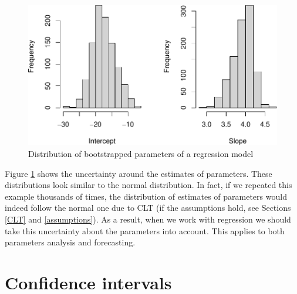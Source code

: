 \documentclass[
]{book}
\theoremstyle{definition}
\theoremstyle{definition}
\theoremstyle{definition}
\theoremstyle{definition}
\theoremstyle{remark}
\begin{document}
\begin{figure}
\centering
\includegraphics{Svetunkov---Statistics-for-Business-Analytics_files/figure-latex/slmSpeedDistanceBoot-1.pdf}
\caption{\label{fig:slmSpeedDistanceBoot}Distribution of bootstrapped parameters of a regression model}
\end{figure}

Figure \ref{fig:slmSpeedDistanceBoot} shows the uncertainty around the estimates of parameters. These distributions look similar to the normal distribution. In fact, if we repeated this example thousands of times, the distribution of estimates of parameters would indeed follow the normal one due to CLT (if the assumptions hold, see Sections \ref{CLT} and \ref{assumptions}). As a result, when we work with regression we should take this uncertainty about the parameters into account. This applies to both parameters analysis and forecasting.

\section{Confidence intervals}\label{confidence-intervals}
\end{document}
